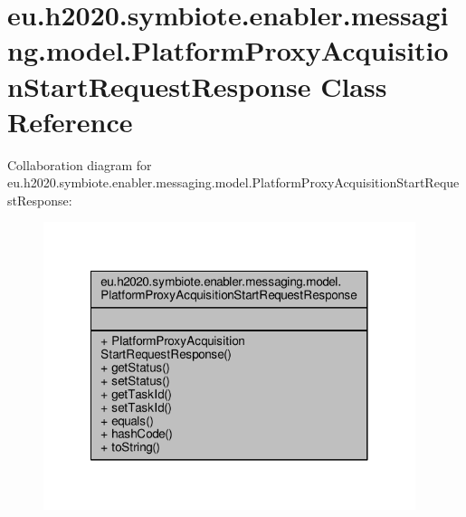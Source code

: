 \hypertarget{classeu_1_1h2020_1_1symbiote_1_1enabler_1_1messaging_1_1model_1_1PlatformProxyAcquisitionStartRequestResponse}{}\section{eu.\+h2020.\+symbiote.\+enabler.\+messaging.\+model.\+Platform\+Proxy\+Acquisition\+Start\+Request\+Response Class Reference}
\label{classeu_1_1h2020_1_1symbiote_1_1enabler_1_1messaging_1_1model_1_1PlatformProxyAcquisitionStartRequestResponse}


Collaboration diagram for eu.\+h2020.\+symbiote.\+enabler.\+messaging.\+model.\+Platform\+Proxy\+Acquisition\+Start\+Request\+Response\+:
\nopagebreak
\begin{figure}[H]
\begin{center}
\leavevmode
\includegraphics[width=308pt]{classeu_1_1h2020_1_1symbiote_1_1enabler_1_1messaging_1_1model_1_1PlatformProxyAcquisitionStartRequestResponse__coll__graph}
\end{center}
\end{figure}
